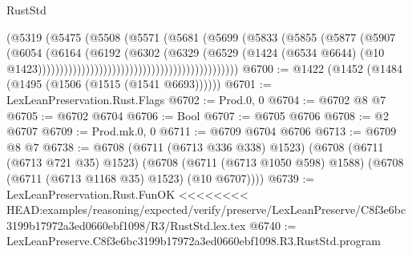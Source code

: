 \begin{lexlean}{RustStd}
\begin{coremodule}
{\begin{coremodule}
{{{{{{{{{{{{{{{{{{{{{{{{{{{{{{{{{{{{{{{{{{{{                                                            (@5319
                                                              (@5475
                                                                (@5508
                                                                  (@5571
                                                                    (@5681
                                                                      (@5699
                                                                        (@5833
                                                                          (@5855
                                                                            (@5877
                                                                              (@5907
                                                                                (@6054
                                                                                  (@6164
                                                                                    (@6192
                                                                                      (@6302
                                                                                        (@6329
                                                                                          (@6529
                                                                                            (@1424
                                                                                              (@6534
                                                                                                @6644)
                                                                                              (@10
                                                                                                @1423))))))))))))))))))))))))))))))))))))))))))))))
@6700 := @1422 (@1452 (@1484 (@1495 (@1506 (@1515 (@1541 @6693))))))
@6701 := LexLeanPreservation.Rust.Flags
@6702 := Prod.{0, 0}
@6704 := @6702 @8 @7
@6705 := @6702 @6704
@6706 := Bool
@6707 := @6705 @6706
@6708 := @2 @6707
@6709 := Prod.mk.{0, 0}
@6711 := @6709 @6704 @6706
@6713 := @6709 @8 @7
@6738 := @6708
    (@6711 (@6713 @336 @338) @1523)
    (@6708
      (@6711 (@6713 @721 @35) @1523)
      (@6708 (@6711 (@6713 @1050 @598) @1588) (@6708 (@6711 (@6713 @1168 @35) @1523) (@10 @6707))))
@6739 := LexLeanPreservation.Rust.FunOK
<<<<<<<< HEAD:examples/reasoning/expected/verify/preserve/LexLeanPreserve/C8f3e6bc3199b17972a3ed0660ebf1098/R3/RustStd.lex.tex
@6740 := LexLeanPreserve.C8f3e6bc3199b17972a3ed0660ebf1098.R3.RustStd.program
}}}}}}}}}}}}}}}}}}}}}}}}}}}}}}}}}}}}}}}}}}}}
\end{coremodule}}
\end{coremodule}
\end{lexlean}
